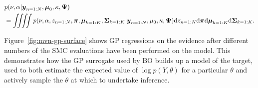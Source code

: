\begin{align}
\begin{split}
& p(\nu, \alpha | \boldsymbol{y}_{n=1:N}, \boldsymbol{\mu}_0, \kappa, \boldsymbol{\Psi}) \\
&= \iiiint p(\nu, \alpha, z_{n=1:N}, \boldsymbol{\pi}, \boldsymbol{\mu}_{k=1:K}, \boldsymbol{\Sigma}_{k=1:K} | \boldsymbol{y}_{n=1:N}, \mu_0, \kappa, \boldsymbol{\Psi}) \mathrm{d}z_{n=1:N}\mathrm{d}\boldsymbol{\pi}\mathrm{d}\boldsymbol{\mu}_{k=1:K}\mathrm{d}\boldsymbol{\Sigma}_{k=1:K}.
\end{split}
\end{align}

Figure~\ref{fig:mvn-gp-surface} shows GP regressions on the evidence after different numbers of the SMC evaluations have been performed on the model.  This demonstrates how the GP surrogate used by BO builds up a model of the target, used to both estimate the expected value of $\log p(Y,\theta)$ for a particular $\theta$ and actively sample the $\theta$ at which to undertake inference.










% 
